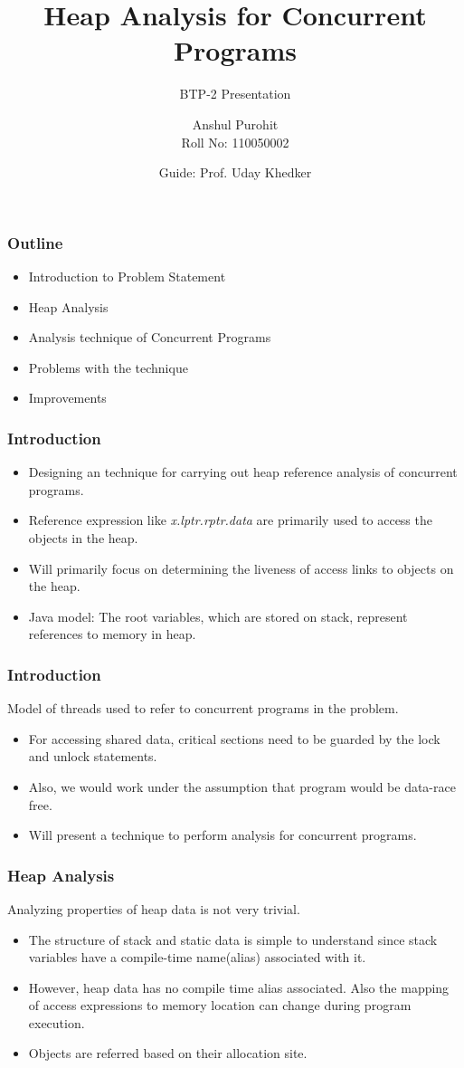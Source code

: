 \documentclass{beamer}
\title[HRA for Concurrent Programs] %
{Heap Analysis for Concurrent Programs}
\subtitle{BTP-2 Presentation}
\author[Anshul Purohit] %
{
Anshul Purohit \\
Roll No: 110050002 \\
}
\institute[Universitäten Hier und Dort] %
{
	Indian Institute of Technology Bombay
}
\date[KPT 2004] %
{
Guide: Prof. Uday Khedker \\
}
\begin{document}
\frame{\titlepage}
\begin{frame}

\frametitle{Outline}
\begin{itemize}
\item Introduction to Problem Statement
\item Heap Analysis 
\item Analysis technique of Concurrent Programs
\item Problems with the technique
\item Improvements 
\end{itemize}
\end{frame}
	
  \begin{frame}
  \frametitle{Introduction}
  \begin{itemize}
  \item Designing an technique for carrying
  out heap reference analysis of concurrent programs.
  \item Reference expression like \emph{x.lptr.rptr.data} are primarily used to access the objects in the heap.
  \item Will primarily focus on determining the  liveness of access links to objects on the heap.
  \item Java model: The root variables, which are stored on stack, represent references to memory in heap.
     
  \end{itemize}
  \end{frame}
  
  \begin{frame}
  	\frametitle{Introduction}
  	
  	 Model of threads used to refer to concurrent programs in the problem.
  	\begin{itemize}
  		\item For accessing shared data,
  		critical sections need to be guarded by the lock and unlock statements.
  		\item Also, we would work under the assumption that program would be data-race free.
  		\item Will present a technique to perform analysis for concurrent programs.  
  		
  	\end{itemize}
  	
  \end{frame}
  
  \begin{frame}
\frametitle{Heap Analysis}
	Analyzing properties of heap data is not very trivial.  

\begin{itemize}
	\item The structure of stack and static data is simple to understand since stack variables have a compile-time name(alias) associated with it.
	\item However, heap data has no compile time alias associated. Also the mapping of access expressions to memory location can change during program execution.
	\item Objects are referred based on their allocation site.
\end{itemize}
  \end{frame}
  
\end{document}
